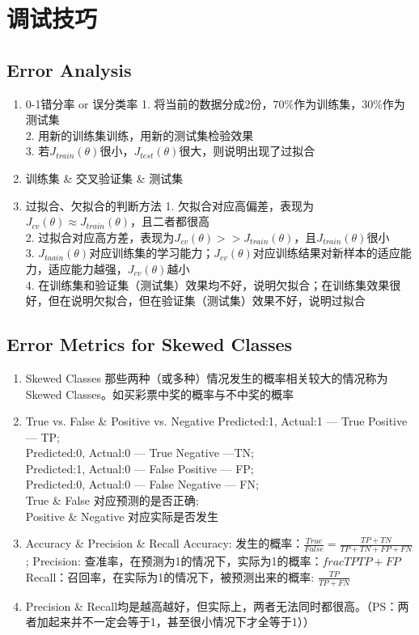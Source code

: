 \section{调试技巧}

\subsection{Error Analysis}
\begin{enumerate}
	\item 0-1错分率 or 误分类率
	1. 将当前的数据分成2份，$70\%$作为训练集，$30\%$作为测试集\\
	2. 用新的训练集训练，用新的测试集检验效果\\
	3. 若$J_{train}(\theta)$很小，$J_{test}(\theta)$很大，则说明出现了过拟合
	\item 训练集 \& 交叉验证集 \& 测试集
	\item 过拟合、欠拟合的判断方法
	1. 欠拟合对应高偏差，表现为$J_{cv}(\theta) \approx J_{train}(\theta)$，且二者都很高 \\
	2. 过拟合对应高方差，表现为$J_{cv}(\theta) >> J_{train}(\theta)$，且$J_{train}(\theta)$很小 \\
	3. $J_{taain}(\theta)$对应训练集的学习能力；$J_{cv}(\theta)$对应训练结果对新样本的适应能力，适应能力越强，$J_{cv}(\theta)$越小 \\
	4. 在训练集和验证集（测试集）效果均不好，说明欠拟合；在训练集效果很好，但在说明欠拟合，但在验证集（测试集）效果不好，说明过拟合
\end{enumerate}

\subsection{Error Metrics for Skewed Classes}
\begin{enumerate}
	\item Skewed Classes
	那些两种（或多种）情况发生的概率相关较大的情况称为Skewed Classes。如买彩票中奖的概率与不中奖的概率
	\item True vs. False \& Positive vs. Negative
	Predicted:1, Actual:1 --- True Positive --- TP; \\
	Predicted:0, Actual:0 --- True Negative ---TN; \\
	Predicted:1, Actual:0 --- False Positive --- FP; \\
	Predicted:0, Actual:0 --- False Negative --- FN; \\
	True \& False 对应预测的是否正确; \\
	Positive \& Negative 对应实际是否发生
	\item Accuracy \& Precision \& Recall
	Accuracy: 发生的概率：$\frac{True}{False} = \frac{TP+TN}{TP+TN+FP+FN}$; 
	Precision: 查准率，在预测为1的情况下，实际为1的概率：$frac{TP}{TP+FP}$ \\
	Recall：召回率，在实际为1的情况下，被预测出来的概率: $\frac{TP}{TP+FN}$
	\item Precision \& Recall均是越高越好，但实际上，两者无法同时都很高。（PS：两者加起来并不一定会等于1，甚至很小情况下才全等于1））
\end{enumerate}

